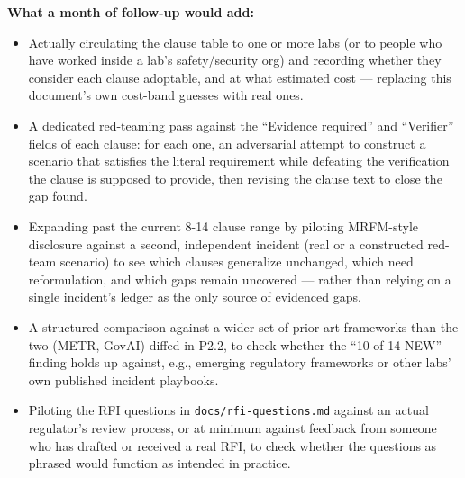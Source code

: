 \textbf{What a month of follow-up would add:}

\begin{itemize}
\item Actually circulating the clause table to one or more labs (or to people who have worked inside a lab's safety/security org) and recording whether they consider each clause adoptable, and at what estimated cost --- replacing this document's own cost-band guesses with real ones.
\item A dedicated red-teaming pass against the ``Evidence required'' and ``Verifier'' fields of each clause: for each one, an adversarial attempt to construct a scenario that satisfies the literal requirement while defeating the verification the clause is supposed to provide, then revising the clause text to close the gap found.
\item Expanding past the current 8-14 clause range by piloting MRFM-style disclosure against a second, independent incident (real or a constructed red-team scenario) to see which clauses generalize unchanged, which need reformulation, and which gaps remain uncovered --- rather than relying on a single incident's ledger as the only source of evidenced gaps.
\item A structured comparison against a wider set of prior-art frameworks than the two (METR, GovAI) diffed in P2.2, to check whether the ``10 of 14 NEW'' finding holds up against, e.g., emerging regulatory frameworks or other labs' own published incident playbooks.
\item Piloting the RFI questions in \texttt{docs/rfi-questions.md} against an actual regulator's review process, or at minimum against feedback from someone who has drafted or received a real RFI, to check whether the questions as phrased would function as intended in practice.
\end{itemize}
